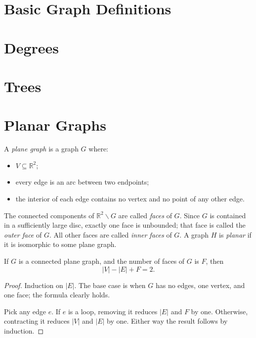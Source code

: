 

    \section{Basic Graph Definitions}
    
    \section{Degrees}
    
    \section{Trees}
    
    \section{Planar Graphs}
        \begin{defn} \label{def_planar_graph}
            A \emph{plane graph} is a graph $G$ where: \begin{itemize}
                \item $V \subseteq \mathbb{R}^2$;
                \item every edge is an arc between two endpoints;
                \item the interior of each edge contains no vertex and no point of any other edge.
            \end{itemize}
            The connected components of $\mathbb{R}^2 \backslash G$ are called \emph{faces} of $G$. Since $G$ is contained in a sufficiently large disc, exactly one face is unbounded; that face is called the \emph{outer face} of $G$. All other faces are called \emph{inner faces} of $G$. A graph $H$ is \emph{planar} if it is isomorphic to some plane graph.
        \end{defn}
        
        \begin{thm} \label{thm_euler_vef}
            If $G$ is a connected plane graph, and the number of faces of $G$ is $F$, then \begin{displaymath}
                |V| - |E| + F = 2.
            \end{displaymath}
        \end{thm}
        
        \begin{proof}
            Induction on $|E|$. The base case is when $G$ has no edges, one vertex, and one face; the formula clearly holds.
            
            Pick any edge $e$. If $e$ is a loop, removing it reduces $|E|$ and $F$ by one. Otherwise, contracting it reduces $|V|$ and $|E|$ by one. Either way the result follows by induction.
        \end{proof}
        
